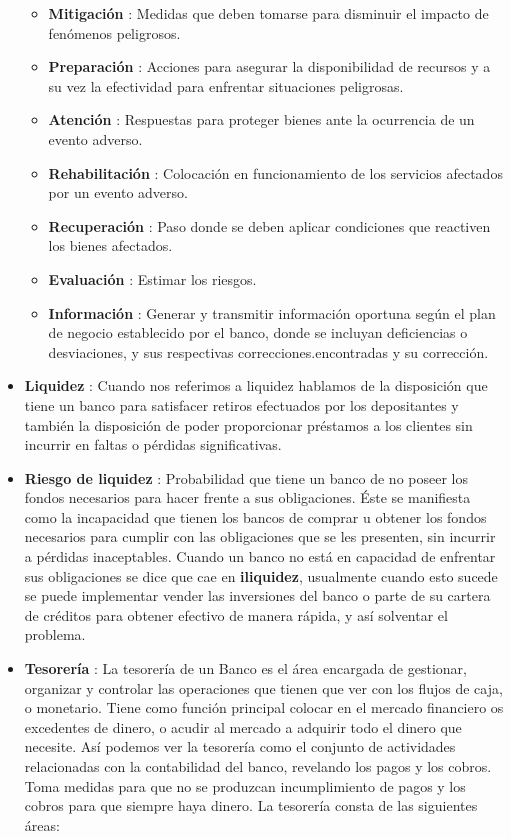 \documentclass[10pt,]{article}
\providecommand{\tightlist}{%
  \setlength{\itemsep}{0pt}\setlength{\parskip}{0pt}}
\begin{document}
\begin{itemize}
  \begin{itemize}
  \tightlist
  \item
    \textbf{Mitigación} : Medidas que deben tomarse para disminuir el
    impacto de fenómenos peligrosos.
  \item
    \textbf{Preparación} : Acciones para asegurar la disponibilidad de
    recursos y a su vez la efectividad para enfrentar situaciones
    peligrosas.
  \item
    \textbf{Atención} : Respuestas para proteger bienes ante la
    ocurrencia de un evento adverso.
  \item
    \textbf{Rehabilitación} : Colocación en funcionamiento de los
    servicios afectados por un evento adverso.
  \item
    \textbf{Recuperación} : Paso donde se deben aplicar condiciones que
    reactiven los bienes afectados.
  \item
    \textbf{Evaluación} : Estimar los riesgos.
  \item
    \textbf{Información} : Generar y transmitir información oportuna
    según el plan de negocio establecido por el banco, donde se incluyan
    deficiencias o desviaciones, y sus respectivas
    correcciones.encontradas y su corrección.
  \end{itemize}
\item
  \textbf{Liquidez} : Cuando nos referimos a liquidez hablamos de la
  disposición que tiene un banco para satisfacer retiros efectuados por
  los depositantes y también la disposición de poder proporcionar
  préstamos a los clientes sin incurrir en faltas o pérdidas
  significativas.
\item
  \textbf{Riesgo de liquidez} : Probabilidad que tiene un banco de no
  poseer los fondos necesarios para hacer frente a sus obligaciones.
  Éste se manifiesta como la incapacidad que tienen los bancos de
  comprar u obtener los fondos necesarios para cumplir con las
  obligaciones que se les presenten, sin incurrir a pérdidas
  inaceptables. Cuando un banco no está en capacidad de enfrentar sus
  obligaciones se dice que cae en \textbf{iliquidez}, usualmente cuando
  esto sucede se puede implementar vender las inversiones del banco o
  parte de su cartera de créditos para obtener efectivo de manera
  rápida, y así solventar el problema.
\item
  \textbf{Tesorería} : La tesorería de un Banco es el área encargada de
  gestionar, organizar y controlar las operaciones que tienen que ver
  con los flujos de caja, o monetario. Tiene como función principal
  colocar en el mercado financiero os excedentes de dinero, o acudir al
  mercado a adquirir todo el dinero que necesite. Así podemos ver la
  tesorería como el conjunto de actividades relacionadas con la
  contabilidad del banco, revelando los pagos y los cobros. Toma medidas
  para que no se produzcan incumplimiento de pagos y los cobros para que
  siempre haya dinero. La tesorería consta de las siguientes áreas:


\end{itemize}
\end{document}
